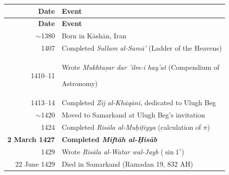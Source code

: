 \documentclass[11pt,a4paper]{article}
\begin{document}
\begin{longtable}{|r|l|}

\hline

\textbf{Date} & \textbf{Event} \\

\hline

\endfirsthead

\hline

\textbf{Date} & \textbf{Event} \\

\hline

\endhead

$\sim$1380 & Born in K\=ash\=an, Iran \\

\hline

1407 & Completed \textit{Sullam al-Sam\=a'} (Ladder of the Heavens) \\

\hline

1410--11 & Wrote \textit{Mukhta\d{s}ar dar 'ilm-i hay'at} (Compendium of

Astronomy) \\

\hline

1413--14 & Completed \textit{Z\=ij al-Kh\=aq\=an\=i}, dedicated to Ulugh Beg \\

\hline

$\sim$1420 & Moved to Samarkand at Ulugh Beg's invitation \\

\hline

1424 & Completed \textit{Ris\=ala al-Mu\d{h}i\d{t}iyya} (calculation of $\pi$)

\\

\hline

\textbf{2 March 1427} & \textbf{Completed \textit{Mift\=ah al-\d{H}is\=ab}} \\

\hline

1429 & Wrote \textit{Ris\=ala al-Watar wal-Jayb} ($\sin 1^\circ$) \\

\hline

22 June 1429 & Died in Samarkand (Ramadan 19, 832 AH) \\

\hline

\end{longtable}
\end{document}
